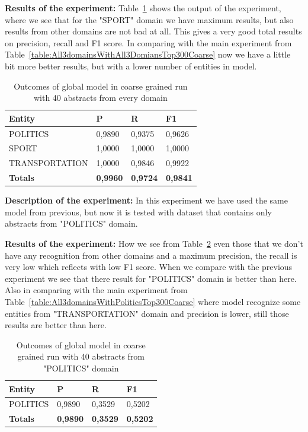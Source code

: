 \documentclass[thesis=M,english]{FITthesis}[2018/05/30]
\begin{document}
	\textbf{Results of the experiment:} Table~\ref{table:GlobalDomainWithAllAbstractsTop40Coarse} shows the output of the experiment, where we see that for the "SPORT" domain we have maximum results, but also results from other domains are not bad at all. This gives a very good total results on precision, recall and F1 score. In comparing with the main experiment from Table~\ref{table:All3domainsWithAll3DomiansTop300Coarse} now we have a little bit more better results, but with a lower number of entities in model.
	
	\begin{table}[H]\centering
		\begin{tabular}{|l|l|l|l|}
			\hline {\textbf{Entity}} & {\textbf{P}} & {\textbf{R}} & {\textbf{F1}}\\\hline
				POLITICS & 0,9890 & 0,9375 & 0,9626\\
				SPORT & 1,0000 & 1,0000 & 1,0000\\
				TRANSPORTATION & 1,0000 & 0,9846 & 0,9922\\\hline
				\textbf{Totals} & \textbf{0,9960} & \textbf{0,9724} & \textbf{0,9841}\\\hline
		\end{tabular}
		\caption{Outcomes of global model in coarse grained run with 40 abstracts from every domain \label{table:GlobalDomainWithAllAbstractsTop40Coarse}}
	\end{table}


	\textbf{Description of the experiment:} In this experiment we have used the same model from previous, but now it is tested with dataset that contains only abstracts from "POLITICS" domain.  

	\textbf{Results of the experiment:} How we see from Table~\ref{table:GlobalDomainWithPoliticsTop40Coarse} even those that we don't have any recognition from other domains and a maximum precision, the recall is very low which reflects with low F1 score. When we compare with the previous experiment we see that there result for "POLITICS" domain is better than here. Also in comparing with the main experiment from Table~\ref{table:All3domainsWithPoliticsTop300Coarse} where model recognize some entities from "TRANSPORTATION" domain and precision is lower, still those results are better than here. 

	\begin{table}[H]\centering
		\begin{tabular}{|l|l|l|l|}
			\hline {\textbf{Entity}} & {\textbf{P}} & {\textbf{R}} & {\textbf{F1}}\\\hline
				POLITICS & 0,9890 & 0,3529 & 0,5202\\\hline
				\textbf{Totals} & \textbf{0,9890} & \textbf{0,3529} & \textbf{0,5202}\\\hline
		\end{tabular}
		\caption{Outcomes of global model in coarse grained run with 40 abstracts from "POLITICS" domain \label{table:GlobalDomainWithPoliticsTop40Coarse}}
	\end{table}
\end{document}
